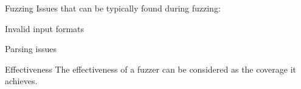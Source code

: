 \begin{frame}{Fuzzing}
	Issues that can be typically found during fuzzing:
	\begin{beameritemize}
		\item Invalid input formats
		\item Parsing issues
	\end{beameritemize}	

	\begin{block}{Effectiveness}
	The effectiveness of a fuzzer can be considered as the coverage it achieves.
\end{block}
\end{frame}